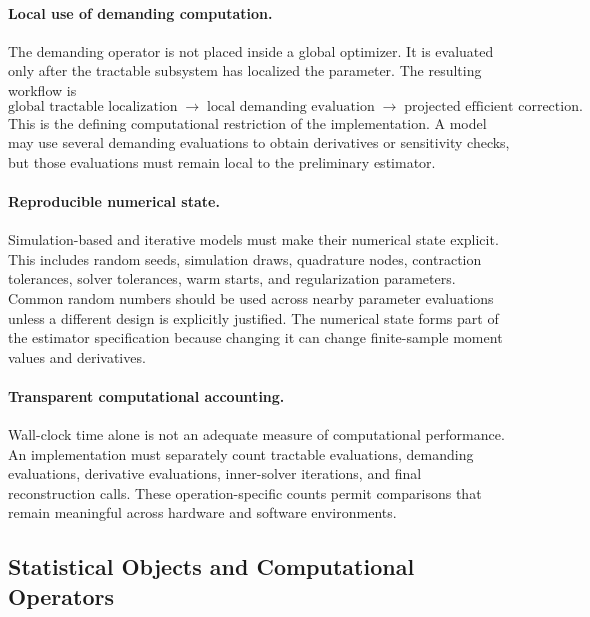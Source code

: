 \paragraph{Local use of demanding computation.}
The demanding operator is not placed inside a global optimizer. It is evaluated
only after the tractable subsystem has localized the parameter. The resulting
workflow is
\[
\text{global tractable localization}
\;\longrightarrow\;
\text{local demanding evaluation}
\;\longrightarrow\;
\text{projected efficient correction}.
\]
This is the defining computational restriction of the implementation. A model
may use several demanding evaluations to obtain derivatives or sensitivity
checks, but those evaluations must remain local to the preliminary estimator.

\paragraph{Reproducible numerical state.}
Simulation-based and iterative models must make their numerical state explicit.
This includes random seeds, simulation draws, quadrature nodes, contraction
tolerances, solver tolerances, warm starts, and regularization parameters.
Common random numbers should be used across nearby parameter evaluations unless
a different design is explicitly justified. The numerical state forms part of
the estimator specification because changing it can change finite-sample moment
values and derivatives.

\paragraph{Transparent computational accounting.}
Wall-clock time alone is not an adequate measure of computational performance.
An implementation must separately count tractable evaluations, demanding
evaluations, derivative evaluations, inner-solver iterations, and final
reconstruction calls. These operation-specific counts permit comparisons that
remain meaningful across hardware and software environments.

\subsection{Statistical Objects and Computational Operators}
\label{app:statistical_objects_operators}


